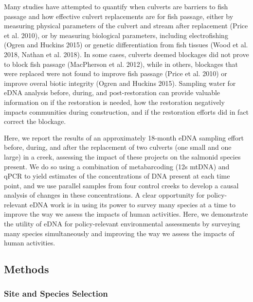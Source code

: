\documentclass[
]{article}
\begin{document}
Many studies have attempted to quantify when culverts are barriers to
fish passage and how effective culvert replacements are for fish
passage, either by measuring physical parameters of the culvert and
stream after replacement (Price et al. 2010), or by measuring biological
parameters, including electrofishing (Ogren and Huckins 2015) or genetic
differentiation from fish tissues (Wood et al. 2018, Nathan et al.
2018). In some cases, culverts deemed blockages did not prove to block
fish passage (MacPherson et al. 2012), while in others, blockages that
were replaced were not found to improve fish passage (Price et al. 2010)
or improve overal biotic integrity (Ogren and Huckins 2015). Sampling
water for eDNA analysis before, during, and post-restoration can provide
valuable information on if the restoration is needed, how the
restoration negatively impacts communities during construction, and if
the restoration efforts did in fact correct the blockage.

Here, we report the results of an approximately 18-month eDNA sampling
effort before, during, and after the replacement of two culverts (one
small and one large) in a creek, assessing the impact of these projects
on the salmonid species present. We do so using a combination of
metabarcoding (12s mtDNA) and qPCR to yield estimates of the
concentrations of DNA present at each time point, and we use parallel
samples from four control creeks to develop a causal analysis of changes
in these concentrations. A clear opportunity for policy-relevant eDNA
work is in using its power to survey many species at a time to improve
the way we assess the impacts of human activities. Here, we demonstrate
the utility of eDNA for policy-relevant environmental assessments by
surveying many species simultaneously and improving the way we assess
the impacts of human activities.

\hypertarget{methods}{%
\subsection{Methods}\label{methods}}

\hypertarget{site-and-species-selection}{%
\subsubsection{Site and Species
Selection}\label{site-and-species-selection}}
\end{document}
